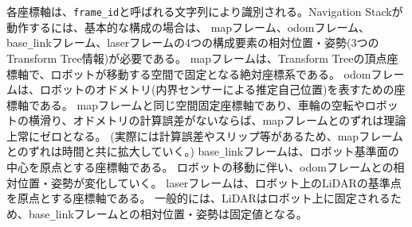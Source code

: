 各座標軸は、\verb|frame_id|と呼ばれる文字列により識別される。Navigation Stackが動作するには、基本的な構成の場合は、
mapフレーム、odomフレーム、base\verb|_|linkフレーム、laserフレームの4つの構成要素の相対位置・姿勢(3つのTransform Tree情報)が必要である。
mapフレームは、Transform Treeの頂点座標軸で、ロボットが移動する空間で固定となる絶対座標系である。
odomフレームは、ロボットのオドメトリ(内界センサーによる推定自己位置)を表すための座標軸である。
mapフレームと同じ空間固定座標軸であり、車輪の空転やロボットの横滑り、オドメトリの計算誤差がないならば、mapフレームとのずれは理論上常にゼロとなる。
(実際には計算誤差やスリップ等があるため、mapフレームとのずれは時間と共に拡大していく。) base\verb|_|linkフレームは、ロボット基準面の中心を原点とする座標軸である。
ロボットの移動に伴い、odomフレームとの相対位置・姿勢が変化していく。
laserフレームは、ロボット上のLiDARの基準点を原点とする座標軸である。
一般的には、LiDARはロボット上に固定されるため、base\verb|_|linkフレームとの相対位置・姿勢は固定値となる。

